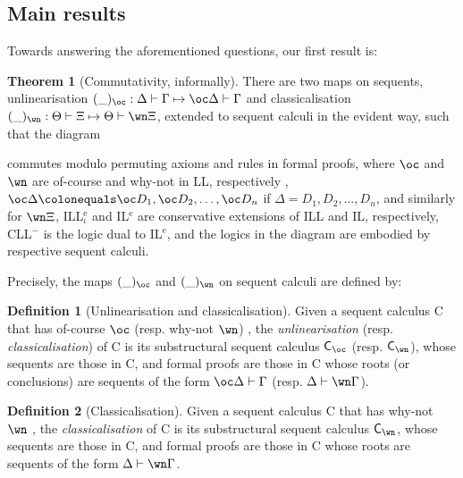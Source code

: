 \documentclass[a4paper]{article}
\theoremstyle{definition}
\newtheorem{definition}{Definition}[section]
\theoremstyle{theorem}
\newtheorem*{theorem*}{Theorem}
\theoremstyle{remark}
\begin{document}
\subsection{Main results}
\label{MainResults}
Towards answering the aforementioned questions, our first result is:
\begin{theorem*}[Commutativity, informally]
There are two maps on sequents, unlinearisation $(\_)_\oc : \Delta \vdash \Gamma \mapsto \oc \Delta \vdash \Gamma$ and classicalisation $(\_)_\wn : \Theta \vdash \Xi \mapsto \Theta \vdash \wn \Xi$, extended to sequent calculi in the evident way, such that the diagram
\begin{mathpar}
\end{mathpar}
commutes modulo permuting axioms and rules in formal proofs, where $\oc$ and $\wn$ are of-course and why-not in LL, respectively \cite{girard1987linear}, $\oc \Delta \colonequals \oc D_1, \oc D_2, \dots, \oc D_n$ if $\Delta = D_1, D_2, \dots, D_n$, and similarly for $\wn \Xi$, ILL$^{\text{e}}_\iota$ and IL$^{\text{e}}$ are conservative extensions of ILL and IL, respectively, CLL$^-$ is the logic dual to IL$^{\text{e}}$, and the logics in the diagram are embodied by respective sequent calculi.
\end{theorem*}

Precisely, the maps $(\_)_\oc$ and $(\_)_\wn$ on sequent calculi are defined by:
\begin{definition}[Unlinearisation and classicalisation]
\label{Defunlinearisation}
Given a sequent calculus \textsf{C} that has of-course $\oc$ (resp. why-not $\wn$) \cite{girard1987linear}, the \emph{unlinearisation} (resp. \emph{classicalisation}) of \textsf{C} is its substructural sequent calculus $\textsf{C}_\oc$ (resp. $\textsf{C}_\wn$), whose sequents are those in \textsf{C}, and formal proofs are those in \textsf{C} whose roots (or conclusions) are sequents of the form $\oc \Delta \vdash \Gamma$ (resp. $\Delta \vdash \wn \Gamma$).
\end{definition}
\begin{definition}[Classicalisation]
\label{Defclassicalisation}
Given a sequent calculus \textsf{C} that has why-not $\wn$ \cite{girard1987linear}, the \emph{classicalisation} of \textsf{C} is its substructural sequent calculus $\textsf{C}_\wn$, whose sequents are those in \textsf{C}, and formal proofs are those in \textsf{C} whose roots are sequents of the form $\Delta \vdash \wn \Gamma$.
\end{definition}
\fi
\end{document}
